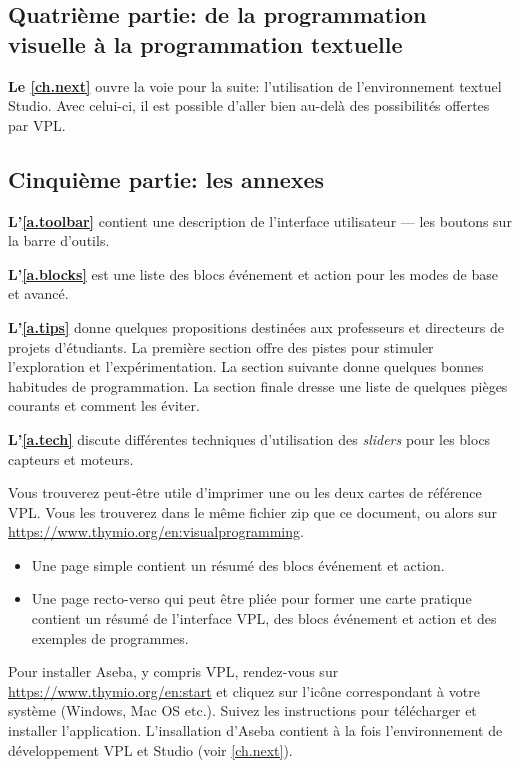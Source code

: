 \bigskip

\subsection*{Quatrième partie: de la programmation visuelle à la programmation textuelle}
\textbf{Le \cref{ch.next}} ouvre la voie pour la suite: l'utilisation de l'environnement textuel Studio.
Avec celui-ci, il est possible d'aller bien au-delà des possibilités offertes par VPL.

\bigskip

\subsection*{Cinquième partie: les annexes}

\textbf{L'\cref{a.toolbar}} contient une description de l'interface utilisateur --- les boutons sur la barre d'outils.

\textbf{L'\cref{a.blocks}} est une liste des blocs événement et action pour les modes de base et avancé.

\textbf{L'\cref{a.tips}} donne quelques propositions destinées aux professeurs et directeurs de projets d'étudiants.
La première section offre des pistes pour stimuler l'exploration et l'expérimentation.
La section suivante donne quelques bonnes habitudes de programmation.
La section finale dresse une liste de quelques pièges courants et comment les éviter.

\textbf{L'\cref{a.tech}} discute différentes techniques d'utilisation des \textit{sliders} pour les blocs capteurs et moteurs.

 \quad {}

Vous trouverez peut-être utile d'imprimer une ou les deux cartes de référence VPL.
Vous les trouverez dans le même fichier zip que ce document, ou alors sur \\\href{https://www.thymio.org/en:visualprogramming}{https://www.thymio.org/en:visualprogramming}.

\begin{itemize}
\item Une page simple contient un résumé des blocs événement et action.
\item Une page recto-verso qui peut être pliée pour former une carte pratique contient un résumé de l'interface VPL, des blocs événement et action et des exemples de programmes.
\end{itemize}

Pour installer Aseba, y compris VPL, rendez-vous sur
\href{https://www.thymio.org/en:start}{https://www.thymio.org/en:start}
et cliquez sur l'icône correspondant à votre système (Windows, Mac OS etc.).
Suivez les instructions pour télécharger et installer l'application.
L'insallation d'Aseba contient à la fois l'environnement de développement VPL et Studio (voir \cref{ch.next}).

